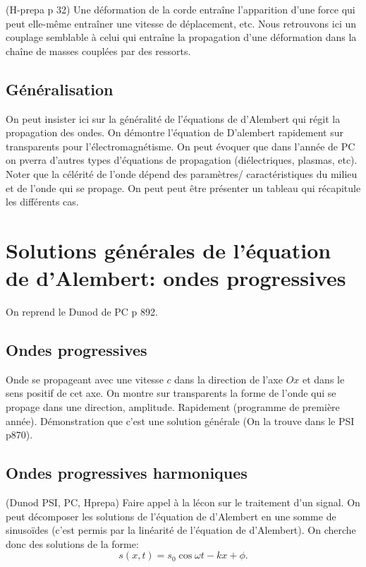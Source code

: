 \documentclass[french, a4paper, 10pt, twocolumn, landscape]{article}
\begin{document}
(H-prepa p 32) Une déformation de la corde entraîne l’apparition d’une force qui
peut elle-même entraîner une vitesse de déplacement, etc. Nous retrouvons ici
un couplage semblable à celui qui entraîne la propagation d’une déformation
dans la chaîne de masses couplées par des ressorts.

\subsection*{Généralisation}

On peut insister ici sur la généralité de l'équations de d'Alembert qui régit la propagation des ondes. On démontre l'équation de D'alembert rapidement sur transparents pour l'électromagnétisme. On peut évoquer que dans l'année de PC on pverra d'autres types d'équations de propagation (diélectriques, plasmas, etc).  Noter que la célérité de l'onde dépend des paramètres/ caractéristiques du milieu et de l'onde qui se propage. On peut peut être présenter un tableau qui récapitule les différents cas.

\section*{Solutions générales de l'équation de d'Alembert: ondes progressives}

On reprend le Dunod de PC p 892. 

\subsection*{Ondes progressives}

Onde se propageant avec une vitesse $c$ dans la direction de l'axe $Ox$ et dans le sens positif de cet axe. On montre sur transparents la forme de l'onde qui se propage dans une direction, amplitude. Rapidement (programme de première année). Démonstration que c'est une solution générale (On la trouve dans le PSI p870).

\subsection*{Ondes progressives harmoniques}

(Dunod PSI, PC, Hprepa) Faire appel à la lécon sur le traitement d'un signal. On peut décomposer les solutions de l'équation de d'Alembert en une somme de sinusoïdes (c'est permis par la linéarité de l'équation de d'Alembert). On cherche donc des solutions de la forme:
\begin{equation}
    s(x,t) = s_0 \cos{\omega t-kx+\phi}.
\end{equation}
\end{document}
